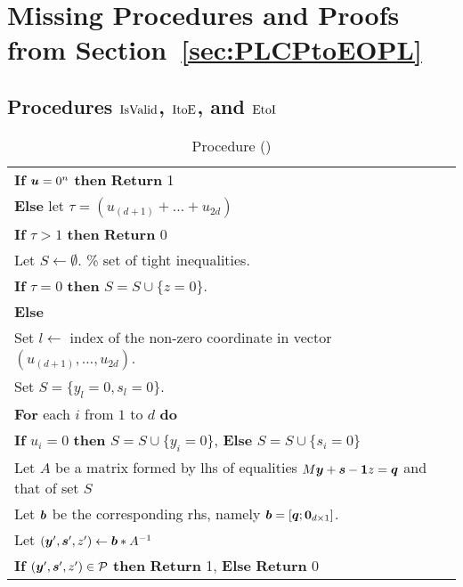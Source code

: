 \newpage

\section{Missing Procedures and Proofs from Section~\ref{sec:PLCPtoEOPL}}\label{app:PLCPtoEOPL}
\subsection{Procedures $\mbox{IsValid}$, $\mbox{ItoE}$, and $\mbox{EtoI}$}\label{app:proc}
\begin{table}[!hbt]
\caption{Procedure \isvalid(\uu)}\label{tab:iv}
\begin{tabular}{|l|}
\hline
\hspace{5pt} {\bf If} $\mbox{\boldmath $u$}=0^{n}$ {\bf then} {\bf Return} 1\\
\hspace{5pt} {\bf Else} let $\tau = (u_{(d+1)}+\dots+u_{2d})$\\
\hspace{15pt} {\bf If} $\tau> 1$ {\bf then} {\bf Return} 0\\
\hspace{15pt} Let $S\leftarrow \emptyset$. \% set of tight inequalities. \\
\hspace{15pt} {\bf If} $\tau = 0$ {\bf then} $S=S\cup \{ z=0\}$. \\
\hspace{15pt} {\bf Else}\\
\hspace{30pt} Set $l\leftarrow $ index of the non-zero coordinate in vector $(u_{(d+1)},\dots,u_{2d})$. \\
\hspace{30pt} Set $S=\{y_l=0, s_l=0\}$.\\
\hspace{15pt} {\bf For} each $i$ from $1$ to $d$ {\bf do} \\
\hspace{30pt} {\bf If} $u_i=0$ {\bf then} $S=S\cup \{y_i=0\}$, {\bf Else} $S=S\cup \{s_i=0\}$\\
\hspace{15pt} Let $A$ be a matrix formed by lhs of equalities $M\mbox{\boldmath $y$}+\mbox{\boldmath $s$} -\mbox{\boldmath $1$} z=\mbox{\boldmath $q$}$ and that of set $S$\\
\hspace{15pt} Let $\mbox{\boldmath $b$}$ be the corresponding rhs, namely $\mbox{\boldmath $b$}=[\mbox{\boldmath $q$}; \mbox{\boldmath $0$}_{d\times 1}]$.\\
\hspace{15pt} Let $(\mbox{\boldmath $y$}',\mbox{\boldmath $s$}',z') \leftarrow \mbox{\boldmath $b$} * A^{-1}$\\
\hspace{15pt} {\bf If} $(\mbox{\boldmath $y$}',\mbox{\boldmath $s$}',z') \in \mbox{${\mathcal P}$}$ {\bf then} {\bf Return} 1, {\bf Else} {\bf Return} 0 \\
\hline
\end{tabular}
\end{table}

